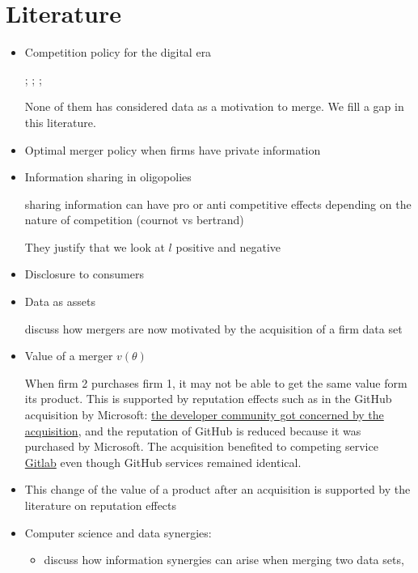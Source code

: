 \documentclass[a4paper,leqno]{article}%
\renewcommand{\t}{\theta}
\renewcommand{\t}{\theta}
\begin{document}
\section{Literature}
\begin{itemize}\setlength\itemsep{-1em}
    \item Competition policy for the digital era
    
    \cite{tirole2020competition}; \cite{scott2019committee}; \cite{cremer2019competition}; \cite{cabral2020merger}
    
    None of them has considered data as a motivation to merge. We fill a gap in this literature.
    
    \item Optimal merger policy when firms have private information \cite{Besanko1993}
    \item Information sharing in oligopolies
    
    \cite{vives1984duopoly, gal1986information} sharing information can have pro or anti competitive effects depending on the nature of competition (cournot vs bertrand)
    
    They justify that we look at $l$ positive and negative
    \item Disclosure to consumers 
    \item Data as assets
    
    \cite{stucke2016introduction} discuss how mergers are now motivated by the acquisition of a firm data set
    
    \item Value of a merger $v(\t)$
    
    When firm 2 purchases firm 1, it may not be able to get the same value form its product. This is supported by reputation effects such as in the GitHub acquisition by Microsoft: \href{https://www.theverge.com/2018/10/26/17954714/microsoft-github-deal-acquisition-complete}{the developer community got concerned by the acquisition}, and the reputation of GitHub is reduced because it was purchased by Microsoft. The acquisition benefited to competing service \href{https://www.itprotoday.com/linux/why-open-source-software-moving-gitlab-after-microsoft-github-deal}{Gitlab} even though GitHub services remained identical.
    
    \item This change of the value of a product after an acquisition is supported by the literature on reputation effects \citep{tadelis1999s}
    
    \item Computer science and data synergies:
\begin{itemize}
    \item \cite{bertschinger2014quantifying, Griffith2014, olbrich2015information} discuss how information synergies can arise when merging two data sets, 
    

\end{itemize}
\end{itemize}
\end{document}
